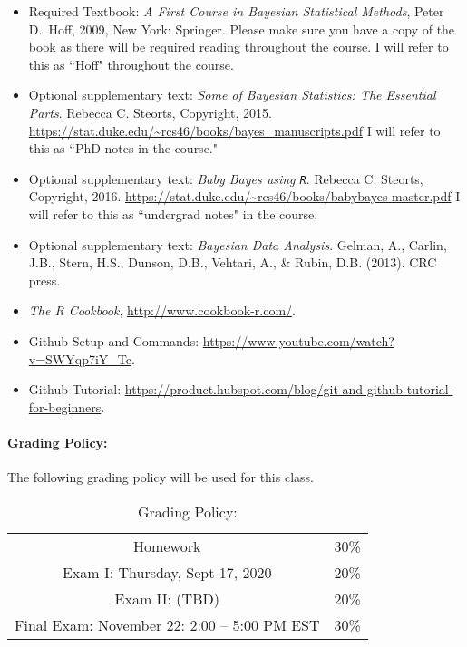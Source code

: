 \documentclass[11pt]{article}
\begin{document}
\begin{itemize}
\item[] Required Textbook: \textit{A First Course in Bayesian Statistical Methods}, Peter D.\ Hoff, 2009, New York: Springer. Please make sure you have a copy of the book as there will be required reading throughout the course. I will refer to this as ``Hoff" throughout the course. 
\item[] Optional supplementary text:  \textit{Some of Bayesian Statistics: The Essential Parts}. Rebecca C. Steorts, Copyright, 2015. \url{https://stat.duke.edu/~rcs46/books/bayes_manuscripts.pdf} I will refer to this as ``PhD notes in the course."
\item[] Optional supplementary text:  \textit{Baby Bayes using \texttt{R}}. Rebecca C. Steorts, Copyright, 2016. 
\url{https://stat.duke.edu/~rcs46/books/babybayes-master.pdf} I will refer to this as ``undergrad notes" in the course. 
\item[] Optional supplementary text:  \textit{Bayesian Data Analysis}. Gelman, A., Carlin, J.B., Stern, H.S., Dunson, D.B., Vehtari, A., \& Rubin, D.B. (2013). CRC press.
\item[] \emph{The R Cookbook}, \url{http://www.cookbook-r.com/}.
\item[] Github Setup and Commands: \url{https://www.youtube.com/watch?v=SWYqp7iY_Tc}.
\item[] Github Tutorial: \url{https://product.hubspot.com/blog/git-and-github-tutorial-for-beginners}.

\end{itemize}

\paragraph{Grading Policy:} 
The following grading policy will be used for this class. 

\begin{table}[h!]
\caption{Grading Policy:}
\begin{center}
\begin{tabular}{cc}
Homework &30\%\\
Exam I:  Thursday, Sept 17, 2020 &20\%\\
Exam  II: (TBD) & 20\%\\
Final Exam:  November 22: 2:00 -- 5:00 PM EST & 30\%\\
\end{tabular}
\end{center}
\label{default}
\end{table}%
\end{document}
